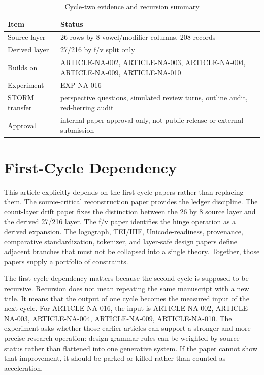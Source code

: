 \documentclass[sigconf,nonacm]{acmart}
\begin{document}
\begin{table}[t]
\caption{Cycle-two evidence and recursion summary}
\label{tab:cycle2}
\begin{tabular}{p{}p{}}
\toprule
Item & Status \\
\midrule
Source layer & 26 rows by 8 vowel/modifier columns, 208 records \\
Derived layer & 27/216 by f/v split only \\
Builds on & ARTICLE-NA-002, ARTICLE-NA-003, ARTICLE-NA-004, ARTICLE-NA-009, ARTICLE-NA-010 \\
Experiment & EXP-NA-016 \\
STORM transfer & perspective questions, simulated review turns, outline audit, red-herring audit \\
Approval & internal paper approval only, not public release or external submission \\
\bottomrule
\end{tabular}
\end{table}


\section{First-Cycle Dependency}
This article explicitly depends on the first-cycle papers rather than replacing
them. The source-critical reconstruction paper provides the ledger discipline.
The count-layer drift paper fixes the distinction between the 26 by 8 source
layer and the derived 27/216 layer. The f/v paper identifies the hinge operation
as a derived expansion. The logograph, TEI/IIIF, Unicode-readiness, provenance,
comparative standardization, tokenizer, and layer-safe design papers define
adjacent branches that must not be collapsed into a single theory. Together,
those papers supply a portfolio of constraints.

The first-cycle dependency matters because the second cycle is supposed to be
recursive. Recursion does not mean repeating the same manuscript with a new
title. It means that the output of one cycle becomes the measured input of the
next cycle. For ARTICLE-NA-016, the input is ARTICLE-NA-002, ARTICLE-NA-003, ARTICLE-NA-004, ARTICLE-NA-009, ARTICLE-NA-010. The experiment asks
whether those earlier articles can support a stronger and more precise research
operation: design grammar rules can be weighted by source status rather than flattened into one generative system. If the paper cannot show that improvement, it should be
parked or killed rather than counted as acceleration.
\end{document}
